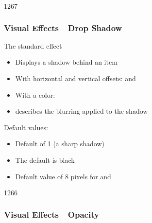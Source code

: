 \begin{slide}{1267}\frametitle{Visual Effects~\textendash~Drop Shadow}

The standard  effect

\begin{itemize}
\item Displays a shadow behind an item
\item With horizontal and vertical offsets:  and 
\item With a color: 
\item {} describes the blurring applied to the shadow
\end{itemize}

\vspace*{0.5em}

\vspace*{1em}
Default values:

\begin{itemize}
\item Default  of 1 (a sharp shadow)
\item The default  is black
\item Default value of 8 pixels for  and 
\end{itemize}

\end{slide}


\begin{slide}{1266}\frametitle{Visual Effects~\textendash~Opacity}




\end{slide}


